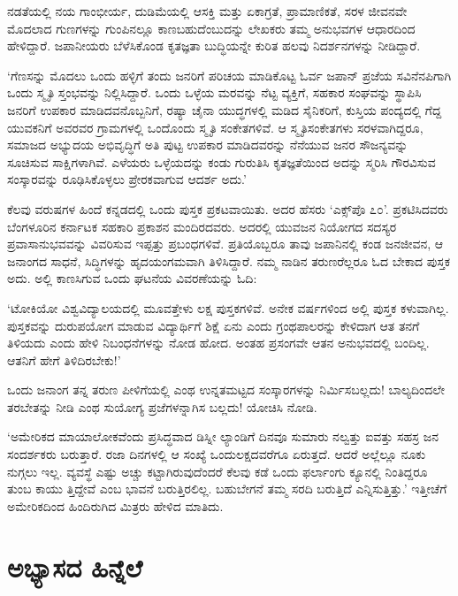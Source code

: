 ನಡತೆಯಲ್ಲಿ ನಯ ಗಾಂಭೀರ್ಯ, ದುಡಿಮೆಯಲ್ಲಿ ಆಸಕ್ತಿ ಮತ್ತು ಏಕಾಗ್ರತೆ, ಪ್ರಾಮಾಣಿಕತೆ, ಸರಳ ಜೀವನವೇ ಮೊದಲಾದ ಗುಣಗಳನ್ನು ಗುಂಪಿನಲ್ಲೂ ಕಾಣಬಹುದೆಂಬುದನ್ನು ಲೇಖಕರು ತಮ್ಮ ಅನುಭವಗಳ ಆಧಾರದಿಂದ ಹೇಳಿದ್ದಾರೆ. ಜಪಾನೀಯರು ಬೆಳೆಸಿಕೊಂಡ ಕೃತಜ್ಞತಾ ಬುದ್ಧಿಯನ್ನೇ ಕುರಿತ ಹಲವು ನಿದರ್ಶನಗಳನ್ನು ನೀಡಿದ್ದಾರೆ.

‘ಗೆಣಸನ್ನು ಮೊದಲು ಒಂದು ಹಳ್ಳಿಗೆ ತಂದು ಜನರಿಗೆ ಪರಿಚಯ ಮಾಡಿಕೊಟ್ಟ ಓರ್ವ ಜಪಾನ್ ಪ್ರಜೆಯ ಸವಿನೆನಪಿಗಾಗಿ ಒಂದು ಸ್ಮೃತಿ ಸ್ತಂಭವನ್ನು ನಿಲ್ಲಿಸಿದ್ದಾರೆ. ಒಂದು ಒಳ್ಳೆಯ ಮರವನ್ನು ನೆಟ್ಟ ವ್ಯಕ್ತಿಗೆ, ಸಹಕಾರ ಸಂಘವನ್ನು ಸ್ಥಾಪಿಸಿ ಜನರಿಗೆ ಉಪಕಾರ ಮಾಡಿದವನೊಬ್ಬನಿಗೆ, ರಷ್ಯಾ ಚೈನಾ ಯುದ್ಧಗಳಲ್ಲಿ ಮಡಿದ ಸೈನಿಕರಿಗೆ, ಕುಸ್ತಿಯ ಪಂದ್ಯದಲ್ಲಿ ಗೆದ್ದ ಯುವಕನಿಗೆ ಅವರವರ ಗ್ರಾಮಗಳಲ್ಲಿ ಒಂದೊಂದು ಸ್ಮೃತಿ ಸಂಕೇತಗಳಿವೆ. ಆ ಸ್ಮೃತಿಸಂಕೇತಗಳು ಸರಳವಾಗಿದ್ದರೂ, ಸಮಾಜದ ಅಭ್ಯುದಯ ಅಭಿವೃದ್ಧಿಗೆ ಅತಿ ಪುಟ್ಟ ಉಪಕಾರ ಮಾಡಿದವರನ್ನು ನೆನೆಯುವ ಜನರ ಸೌಜನ್ಯವನ್ನು ಸೂಚಿಸುವ ಸಾಕ್ಷಿಗಳಾಗಿವೆ. ಎಳೆಯರು ಒಳ್ಳೆಯದನ್ನು ಕಂಡು ಗುರುತಿಸಿ ಕೃತಜ್ಞತೆಯಿಂದ ಅದನ್ನು ಸ್ಮರಿಸಿ ಗೌರವಿಸುವ ಸಂಸ್ಕಾರವನ್ನು ರೂಢಿಸಿಕೊಳ್ಳಲು ಪ್ರೇರಕವಾಗುವ ಆದರ್ಶ ಅದು.’

ಕೆಲವು ವರುಷಗಳ ಹಿಂದೆ ಕನ್ನಡದಲ್ಲಿ ಒಂದು ಪುಸ್ತಕ ಪ್ರಕಟವಾಯಿತು. ಅದರ ಹೆಸರು ‘ಎಕ್ಸ್​ಪೊ ೭೦’. ಪ್ರಕಟಿಸಿದವರು ಬೆಂಗಳೂರಿನ ಕರ್ನಾಟಕ ಸಹಕಾರಿ ಪ್ರಕಾಶನ ಮಂದಿರದವರು. ಅದರಲ್ಲಿ ಯುವಜನ ನಿಯೋಗದ ಸದಸ್ಯರ ಪ್ರವಾಸಾನುಭವವನ್ನು ವಿವರಿಸುವ ಇಪ್ಪತ್ತು ಪ್ರಬಂಧಗಳಿವೆ. ಪ್ರತಿಯೊಬ್ಬರೂ ತಾವು ಜಪಾನಿನಲ್ಲಿ ಕಂಡ ಜನಜೀವನ, ಆ ಜನಾಂಗದ ಸಾಧನೆ, ಸಿದ್ಧಿಗಳನ್ನು ಹೃದಯಂಗಮವಾಗಿ ತಿಳಿಸಿದ್ದಾರೆ. ನಮ್ಮ ನಾಡಿನ ತರುಣರೆಲ್ಲರೂ ಓದ ಬೇಕಾದ ಪುಸ್ತಕ ಅದು. ಅಲ್ಲಿ ಕಾಣಸಿಗುವ ಒಂದು ಘಟನೆಯ ವಿವರಣೆಯನ್ನು ಓದಿ:

‘ಟೋಕಿಯೋ ವಿಶ್ವವಿದ್ಯಾಲಯದಲ್ಲಿ ಮೂವತ್ತೇಳು ಲಕ್ಷ ಪುಸ್ತಕಗಳಿವೆ. ಅನೇಕ ವರ್ಷಗಳಿಂದ ಅಲ್ಲಿ ಪುಸ್ತಕ ಕಳುವಾಗಿಲ್ಲ. ಪುಸ್ತಕವನ್ನು ದುರುಪಯೋಗ ಮಾಡುವ ವಿದ್ಯಾರ್ಥಿಗೆ ಶಿಕ್ಷೆ ಏನು ಎಂದು ಗ್ರಂಥಪಾಲರನ್ನು ಕೇಳಿದಾಗ ಆತ ತನಗೆ ತಿಳಿಯದು ಎಂದು ಹೇಳಿ ನಿಬಂಧನೆಗಳನ್ನು ನೋಡ ಹೋದ. ಅಂತಹ ಪ್ರಸಂಗವೇ ಆತನ ಅನುಭವದಲ್ಲಿ ಬಂದಿಲ್ಲ. ಆತನಿಗೆ ಹೇಗೆ ತಿಳಿದಿರಬೇಕು!’

ಒಂದು ಜನಾಂಗ ತನ್ನ ತರುಣ ಪೀಳಿಗೆಯಲ್ಲಿ ಎಂಥ ಉನ್ನತಮಟ್ಟದ ಸಂಸ್ಕಾರಗಳನ್ನು ನಿರ್ಮಿಸಬಲ್ಲದು! ಬಾಲ್ಯದಿಂದಲೇ ತರಬೇತನ್ನು ನೀಡಿ ಎಂಥ ಸುಯೋಗ್ಯ ಪ್ರಜೆಗಳನ್ನಾಗಿಸ ಬಲ್ಲದು! ಯೋಚಿಸಿ ನೋಡಿ.

‘ಅಮೇರಿಕದ ಮಾಯಾಲೋಕವೆಂದು ಪ್ರಸಿದ್ಧವಾದ ಡಿಸ್ನೀ ಲ್ಯಾಂಡಿಗೆ ದಿನವೂ ಸುಮಾರು ನಲ್ವತ್ತು ಐವತ್ತು ಸಹಸ್ರ ಜನ ಸಂದರ್ಶಕರು ಬರುತ್ತಾರೆ. ರಜಾ ದಿನಗಳಲ್ಲಿ ಆ ಸಂಖ್ಯೆ ಒಂದು\break ಲಕ್ಷದವರೆಗೂ ಏರುತ್ತದೆ. ಆದರೆ ಅಲ್ಲೆಲ್ಲೂ ನೂಕು ನುಗ್ಗಲು ಇಲ್ಲ. ವ್ಯವಸ್ಥೆ ಎಷ್ಟು ಅಚ್ಚು ಕಟ್ಟಾಗಿರುವುದೆಂದರೆ ಕೆಲವು ಕಡೆ ಒಂದು ಫರ್ಲಾಂಗು ಕ್ಯೂನಲ್ಲಿ ನಿಂತಿದ್ದರೂ ತುಂಬ ಕಾಯು ತ್ತಿದ್ದೇವೆ ಎಂಬ ಭಾವನೆ ಬರುತ್ತಿರಲಿಲ್ಲ. ಬಹುಬೇಗನೆ ತಮ್ಮ ಸರದಿ ಬರುತ್ತಿದೆ ಎನ್ನಿಸುತ್ತಿತ್ತು.’ ಇತ್ತೀಚೆಗೆ ಅಮೇರಿಕದಿಂದ ಹಿಂದಿರುಗಿದ ಮಿತ್ರರು ಹೇಳಿದ ಮಾತಿದು.


\section*{ಅಭ್ಯಾಸದ ಹಿನ್ನೆಲೆ}


